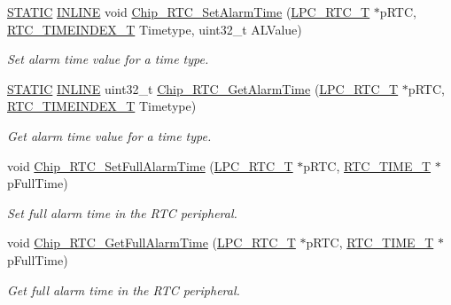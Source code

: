 \begin{DoxyCompactItemize}
\hyperlink{group___l_p_c___types___public___macros_ga10b2d890d871e1489bb02b7e70d9bdfb}{S\+T\+A\+T\+IC} \hyperlink{spifi__18xx__43xx_8h_a2eb6f9e0395b47b8d5e3eeae4fe0c116}{I\+N\+L\+I\+NE} void \hyperlink{group___r_t_c__18_x_x__43_x_x_ga7ac6a9a813f710e8e93c4b598a14a795}{Chip\+\_\+\+R\+T\+C\+\_\+\+Set\+Alarm\+Time} (\hyperlink{struct_l_p_c___r_t_c___t}{L\+P\+C\+\_\+\+R\+T\+C\+\_\+T} $\ast$p\+R\+TC, \hyperlink{group___r_t_c__18_x_x__43_x_x_ga8144898fe628404d396db06dc8aac0e0}{R\+T\+C\+\_\+\+T\+I\+M\+E\+I\+N\+D\+E\+X\+\_\+T} Timetype, uint32\+\_\+t A\+L\+Value)
\begin{DoxyCompactList}\small\item\em Set alarm time value for a time type. \end{DoxyCompactList}\item 
\hyperlink{group___l_p_c___types___public___macros_ga10b2d890d871e1489bb02b7e70d9bdfb}{S\+T\+A\+T\+IC} \hyperlink{spifi__18xx__43xx_8h_a2eb6f9e0395b47b8d5e3eeae4fe0c116}{I\+N\+L\+I\+NE} uint32\+\_\+t \hyperlink{group___r_t_c__18_x_x__43_x_x_gaf094ef7c4ff7295c74be8ab77e39a967}{Chip\+\_\+\+R\+T\+C\+\_\+\+Get\+Alarm\+Time} (\hyperlink{struct_l_p_c___r_t_c___t}{L\+P\+C\+\_\+\+R\+T\+C\+\_\+T} $\ast$p\+R\+TC, \hyperlink{group___r_t_c__18_x_x__43_x_x_ga8144898fe628404d396db06dc8aac0e0}{R\+T\+C\+\_\+\+T\+I\+M\+E\+I\+N\+D\+E\+X\+\_\+T} Timetype)
\begin{DoxyCompactList}\small\item\em Get alarm time value for a time type. \end{DoxyCompactList}\item 
void \hyperlink{group___r_t_c__18_x_x__43_x_x_ga7ad6b4d1d2aaaf093ddde0cef9023ba0}{Chip\+\_\+\+R\+T\+C\+\_\+\+Set\+Full\+Alarm\+Time} (\hyperlink{struct_l_p_c___r_t_c___t}{L\+P\+C\+\_\+\+R\+T\+C\+\_\+T} $\ast$p\+R\+TC, \hyperlink{struct_r_t_c___t_i_m_e___t}{R\+T\+C\+\_\+\+T\+I\+M\+E\+\_\+T} $\ast$p\+Full\+Time)
\begin{DoxyCompactList}\small\item\em Set full alarm time in the R\+TC peripheral. \end{DoxyCompactList}\item 
void \hyperlink{group___r_t_c__18_x_x__43_x_x_ga21b9a7c640870482b47deda15ff0a01b}{Chip\+\_\+\+R\+T\+C\+\_\+\+Get\+Full\+Alarm\+Time} (\hyperlink{struct_l_p_c___r_t_c___t}{L\+P\+C\+\_\+\+R\+T\+C\+\_\+T} $\ast$p\+R\+TC, \hyperlink{struct_r_t_c___t_i_m_e___t}{R\+T\+C\+\_\+\+T\+I\+M\+E\+\_\+T} $\ast$p\+Full\+Time)
\begin{DoxyCompactList}\small\item\em Get full alarm time in the R\+TC peripheral. \end{DoxyCompactList}\item 

\end{DoxyCompactItemize}
